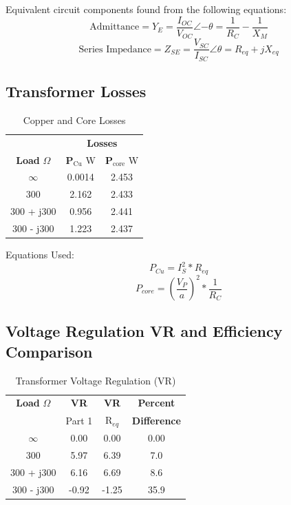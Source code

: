 \documentclass{article}
\begin{document}
Equivalent circuit components found from the following equations:
\[\text{Admittance} = Y_E = \frac{I_{OC}}{V_{OC}}\angle{-\theta} =  \frac{1}{R_C} -
\frac{1}{X_M}\]
\[\text{Series Impedance} = Z_{SE} = \frac{V_{SC}}{I_{SC}}\angle{\theta} = R_{eq} +
jX_{eq}\]

\subsection{Transformer Losses}
\begin{table}[H]
  \centering
  \begin{tabular}{*{3}{c}}
    & \multicolumn{2}{c}{\textbf{Losses}} \\
    \textbf{Load} $\Omega$ & \textbf{P$_\text{Cu}$} W & \textbf{P$_\text{core}$} W \\
    \hline
    $\infty$ & 0.0014 & 2.453 \\
    300 & 2.162 & 2.433 \\
    300 + j300 & 0.956 & 2.441 \\
    300 - j300 & 1.223 & 2.437 \\
  \end{tabular}
  \caption{Copper and Core Losses}
  \label{tab:power_losses}
\end{table}

Equations Used:
\[P_{Cu} = I_S^2 * R_{eq}\]
\[P_{core} = (\frac{V_P}{a})^2 * \frac{1}{R_{C}}\]

\subsection{Voltage Regulation VR and Efficiency Comparison}
\begin{table}[H]
  \centering
  \begin{tabular}{*{4}{c}}
    \textbf{Load} $\Omega$ & \textbf{VR} & \textbf{VR} & \textbf{Percent} \\
    & Part 1 & R$_{eq}$ & \textbf{Difference} \\
    \hline
    $\infty$ & 0.00 & 0.00 & 0.00 \\
    300 & 5.97 & 6.39 & 7.0 \\
    300 + j300 & 6.16 & 6.69 & 8.6 \\
    300 - j300 & -0.92 & -1.25 & 35.9 \\
  \end{tabular}
  \caption{Transformer Voltage Regulation (VR)}
  \label{tab:vr}
\end{table}
\end{document}
